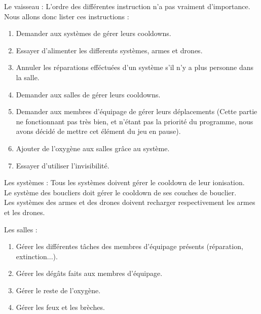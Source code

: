 		Le vaisseau :
  		L'ordre des différentes instruction n'a pas vraiment d'importance. Nous allons donc lister ces instructions : \\
		\begin{enumerate}
			\item Demander aux systèmes de gérer leurs cooldowns.
    	\item Essayer d'alimenter les differents systèmes, armes et drones.
			\item Annuler les réparations efféctuées d'un système s'il n'y a plus personne dans la salle.
			\item Demander aux salles de gérer leurs cooldowns.
     	\item Demander aux membres d'équipage de gérer leurs déplacements (Cette partie ne fonctionnant pas très bien, et n'étant pas la priorité du programme, nous avons décidé de mettre cet élément du jeu en pause).
			\item Ajouter de l'oxygène aux salles grâce au système.
			\item Essayer d'utiliser l'invisibilité.
		\end{enumerate}

		\medskip

		Les systèmes :
		Tous les systèmes doivent gérer le cooldown de leur ionisation.\\
		Le système des boucliers doit gérer le cooldown de ses couches de bouclier.\\
		Les systèmes des armes et des drones doivent recharger respectivement les armes et les drones.
		\medskip

		Les salles :
		\begin{enumerate}
			\item Gérer les différentes tâches des membres d'équipage présents (réparation, extinction...).
			\item Gérer les dégâts faits aux membres d'équipage.
			\item Gérer le reste de l'oxygène.
			\item Gérer les feux et les brèches.
		\end{enumerate} 
